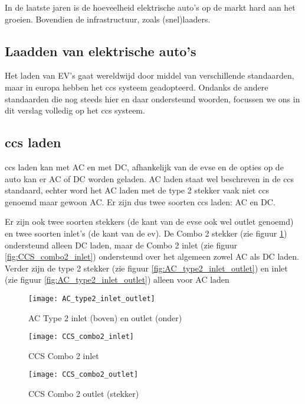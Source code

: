 In de laatste jaren is de hoeveelheid elektrische auto's op de markt hard aan
het groeien. Bovendien de infrastructuur, zoals (snel)laaders. 

\subsection{Laadden van elektrische auto's}

Het laden van EV's gaat wereldwijd door middel van verschillende standaarden,
maar in europa hebben het \ac{ccs} systeem geadopteerd. Ondanks de andere
standaarden die nog steeds hier en daar ondersteund woorden, focussen we ons in
dit verslag volledig op het \ac{ccs} systeem.

\subsection{\ac{ccs} laden}

\ac{ccs} laden kan met AC en met DC, afhankelijk van de \ac{evse} en de opties
op de auto kan er AC of DC worden geladen. AC laden staat wel beschreven in de
\ac{ccs} standaard, echter word het AC laden met de type 2 stekker vaak niet
\ac{ccs} genoemd maar gewoon AC. Er zijn dus twee soorten \ac{ccs} laden: AC en
DC.

Er zijn ook twee soorten stekkers (de kant van de \ac{evse} ook wel outlet
genoemd) en twee soorten inlet's (de kant van de \ac{ev}). De Combo 2 stekker
(zie figuur \ref{fig:CCS_combo2_outlet}) ondersteund alleen DC laden, maar de
Combo 2 inlet (zie figuur \ref{fig:CCS_combo2_inlet}) ondersteund over het
algemeen zowel AC als DC laden. Verder zijn de type 2 stekker (zie figuur
\ref{fig:AC_type2_inlet_outlet}) en inlet (zie figuur
\ref{fig:AC_type2_inlet_outlet}) alleen voor AC laden

\begin{figure}[h]
    \centering
    \begin{minipage}{0.45\textwidth}
        \centerline{\texttt{[image: AC\_type2\_inlet\_outlet]}}
        \caption{AC Type 2 inlet (boven) en outlet (onder)}
        \label{fig:AC_type2_inlet_outlet}
    \end{minipage}\hfill
    \begin{minipage}{0.45\textwidth}
        \centerline{\texttt{[image: CCS\_combo2\_inlet]}}
        \caption{CCS Combo 2 inlet}
        \label{fig:CCS_combo2_inlet}
        \hfill
        \centerline{\texttt{[image: CCS\_combo2\_outlet]}}
        \caption{CCS Combo 2 outlet (stekker)}
        \label{fig:CCS_combo2_outlet}
    \end{minipage}
\end{figure}

